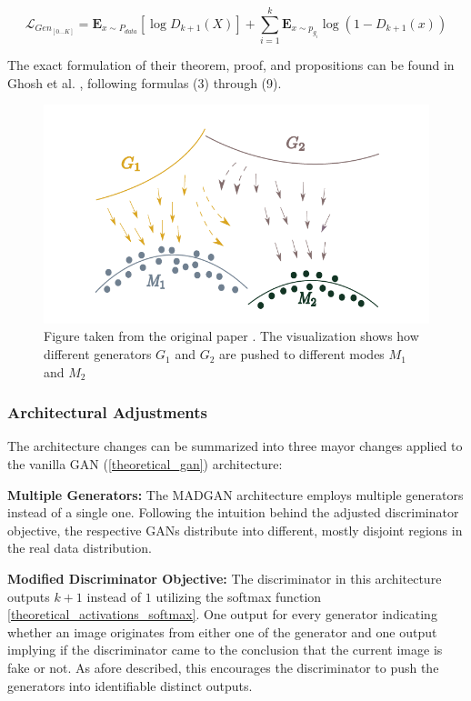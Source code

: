 \begin{equation}
    \mathcal{L}_{Gen_{[0...K]}} = \mathbf{E}_{x \sim P_{data}} [ \log D_{k+1}(X) ] + \sum_{i=1}^{k}\mathbf{E}_{x \sim p_{g_i}} \log (1-D_{k+1}(x))
\end{equation}

\noindent
The exact formulation of their theorem, proof, and propositions can be found in Ghosh et al. \cite{ghosh2018madgan}, following formulas (3) through (9).

\begin{figure}[htbp]
    \centering
    \includegraphics[width=.9\textwidth]{abb/madgan_diverse_mode_push.PNG}
    \caption{Figure taken from the original paper \cite{ghosh2018madgan}. The visualization shows how different generators \(G_{1}\) and \(G_{2}\) are pushed to different modes \(M_{1}\) and \(M_{2}\)}
    \label{fig:figure_madgan_diverse_mode_push}
\end{figure}

\subsubsection{Architectural Adjustments}
\label{theory_madgan_architecture}
The architecture changes can be summarized into three mayor changes applied to the vanilla GAN (\ref{theoretical_gan}) architecture:

\noindent\textbf{Multiple Generators:} The MADGAN architecture employs multiple generators instead of a single one. Following the intuition behind the adjusted discriminator objective, the respective GANs distribute into different, mostly disjoint regions in the real data distribution.

\noindent\textbf{Modified Discriminator Objective:} The discriminator in this architecture outputs \(k + 1\) instead of \(1\) utilizing the softmax function \ref{theoretical_activations_softmax}. One output for every generator indicating whether an image originates from either one of the generator and one output implying if the discriminator came to the conclusion that the current image is fake or not. As afore described, this encourages the discriminator to push the generators into identifiable distinct outputs.

